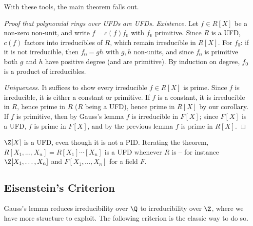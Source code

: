 With these tools, the main theorem falls out.

\begin{proof}[Proof that polynomial rings over UFDs are UFDs]
	\emph{Existence.} Let $f \in R[X]$ be a non-zero non-unit, and write $f = c(f)f_0$ with $f_0$ primitive. Since $R$ is a UFD, $c(f)$ factors into irreducibles of $R$, which remain irreducible in $R[X]$. For $f_0$: if it is not irreducible, then $f_0 = gh$ with $g, h$ non-units, and since $f_0$ is primitive both $g$ and $h$ have positive degree (and are primitive). By induction on degree, $f_0$ is a product of irreducibles.

	\emph{Uniqueness.} It suffices to show every irreducible $f \in R[X]$ is prime. Since $f$ is irreducible, it is either a constant or primitive. If $f$ is a constant, it is irreducible in $R$, hence prime in $R$ ($R$ being a UFD), hence prime in $R[X]$ by our corollary. If $f$ is primitive, then by Gauss's lemma $f$ is irreducible in $F[X]$; since $F[X]$ is a UFD, $f$ is prime in $F[X]$, and by the previous lemma $f$ is prime in $R[X]$.
\end{proof}

\begin{example}
	$\Z[X]$ is a UFD, even though it is not a PID. Iterating the theorem, $R[X_1, \dots, X_n] = R[X_1]\cdots[X_n]$ is a UFD whenever $R$ is -- for instance $\Z[X_1, \dots, X_n]$ and $F[X_1, \dots, X_n]$ for a field $F$.
\end{example}

\subsection{Eisenstein's Criterion}

Gauss's lemma reduces irreducibility over $\Q$ to irreducibility over $\Z$, where we have more structure to exploit. The following criterion is the classic way to do so.

